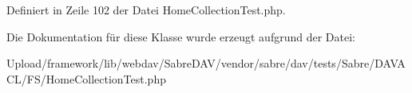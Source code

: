 Definiert in Zeile 102 der Datei Home\+Collection\+Test.\+php.



Die Dokumentation für diese Klasse wurde erzeugt aufgrund der Datei\+:\begin{DoxyCompactItemize}
\item 
Upload/framework/lib/webdav/\+Sabre\+D\+A\+V/vendor/sabre/dav/tests/\+Sabre/\+D\+A\+V\+A\+C\+L/\+F\+S/Home\+Collection\+Test.\+php\end{DoxyCompactItemize}
